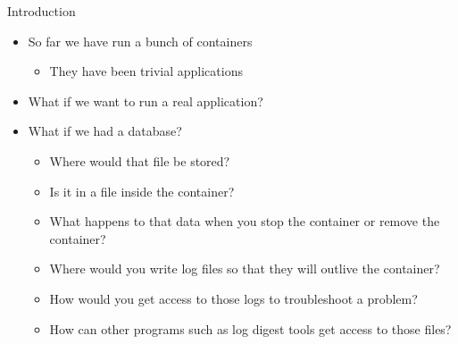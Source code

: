 \documentclass[ignorenonframetext,]{beamer}
\providecommand{\tightlist}{%
  \setlength{\itemsep}{0pt}\setlength{\parskip}{0pt}}
\begin{document}
\begin{frame}{Introduction}
\protect\hypertarget{introduction}{}

\begin{itemize}
\tightlist
\item
  So far we have run a bunch of containers

  \begin{itemize}
  \tightlist
  \item
    They have been trivial applications
  \end{itemize}
\item
  What if we want to run a real application?
\item
  What if we had a database?

  \begin{itemize}
  \tightlist
  \item
    Where would that file be stored?
  \item
    Is it in a file inside the container?
  \item
    What happens to that data when you stop the container or remove the
    container?
  \item
    Where would you write log files so that they will outlive the
    container?
  \item
    How would you get access to those logs to troubleshoot a problem?
  \item
    How can other programs such as log digest tools get access to those
    files?
  \end{itemize}
\end{itemize}

\end{frame}
\end{document}

